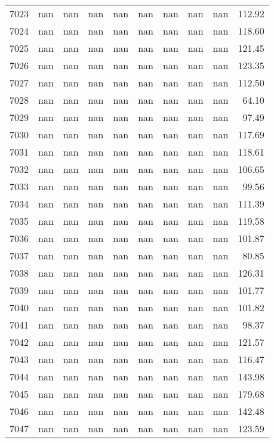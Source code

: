 \begin{tabular}{lrrrrrrrrr}
7023 & nan & nan & nan & nan & nan & nan & nan & nan & 112.92 \\
7024 & nan & nan & nan & nan & nan & nan & nan & nan & 118.60 \\
7025 & nan & nan & nan & nan & nan & nan & nan & nan & 121.45 \\
7026 & nan & nan & nan & nan & nan & nan & nan & nan & 123.35 \\
7027 & nan & nan & nan & nan & nan & nan & nan & nan & 112.50 \\
7028 & nan & nan & nan & nan & nan & nan & nan & nan & 64.10 \\
7029 & nan & nan & nan & nan & nan & nan & nan & nan & 97.49 \\
7030 & nan & nan & nan & nan & nan & nan & nan & nan & 117.69 \\
7031 & nan & nan & nan & nan & nan & nan & nan & nan & 118.61 \\
7032 & nan & nan & nan & nan & nan & nan & nan & nan & 106.65 \\
7033 & nan & nan & nan & nan & nan & nan & nan & nan & 99.56 \\
7034 & nan & nan & nan & nan & nan & nan & nan & nan & 111.39 \\
7035 & nan & nan & nan & nan & nan & nan & nan & nan & 119.58 \\
7036 & nan & nan & nan & nan & nan & nan & nan & nan & 101.87 \\
7037 & nan & nan & nan & nan & nan & nan & nan & nan & 80.85 \\
7038 & nan & nan & nan & nan & nan & nan & nan & nan & 126.31 \\
7039 & nan & nan & nan & nan & nan & nan & nan & nan & 101.77 \\
7040 & nan & nan & nan & nan & nan & nan & nan & nan & 101.82 \\
7041 & nan & nan & nan & nan & nan & nan & nan & nan & 98.37 \\
7042 & nan & nan & nan & nan & nan & nan & nan & nan & 121.57 \\
7043 & nan & nan & nan & nan & nan & nan & nan & nan & 116.47 \\
7044 & nan & nan & nan & nan & nan & nan & nan & nan & 143.98 \\
7045 & nan & nan & nan & nan & nan & nan & nan & nan & 179.68 \\
7046 & nan & nan & nan & nan & nan & nan & nan & nan & 142.48 \\
7047 & nan & nan & nan & nan & nan & nan & nan & nan & 123.59 \\

\end{tabular}

